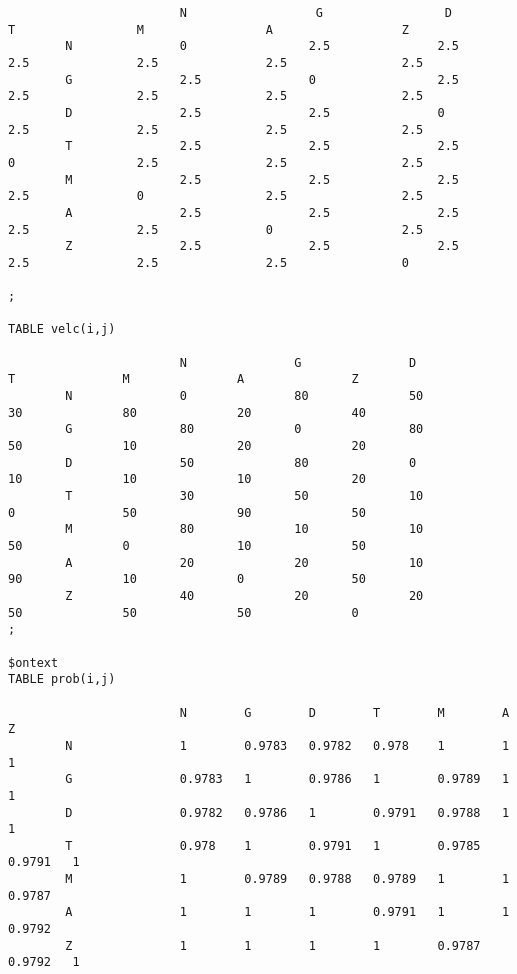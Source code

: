 \documentclass[]{article}
\begin{document}
\begin{lstlisting}
                        N                  G                 D                 T                 M                 A                  Z
        N               0                 2.5               2.5               2.5               2.5               2.5                2.5
        G               2.5               0                 2.5               2.5               2.5               2.5                2.5
        D               2.5               2.5               0                 2.5               2.5               2.5                2.5
        T               2.5               2.5               2.5               0                 2.5               2.5                2.5
        M               2.5               2.5               2.5               2.5               0                 2.5                2.5
        A               2.5               2.5               2.5               2.5               2.5               0                  2.5
        Z               2.5               2.5               2.5               2.5               2.5               2.5                0

;

TABLE velc(i,j)

                        N               G               D               T               M               A               Z
        N               0               80              50              30              80              20              40
        G               80              0               80              50              10              20              20
        D               50              80              0               10              10              10              20
        T               30              50              10              0               50              90              50
        M               80              10              10              50              0               10              50
        A               20              20              10              90              10              0               50
        Z               40              20              20              50              50              50              0
;

$ontext
TABLE prob(i,j)

                        N        G        D        T        M        A        Z
        N               1        0.9783   0.9782   0.978    1        1        1
        G               0.9783   1        0.9786   1        0.9789   1        1
        D               0.9782   0.9786   1        0.9791   0.9788   1        1
        T               0.978    1        0.9791   1        0.9785   0.9791   1
        M               1        0.9789   0.9788   0.9789   1        1        0.9787
        A               1        1        1        0.9791   1        1        0.9792
        Z               1        1        1        1        0.9787   0.9792   1


\end{lstlisting}
\end{document}
